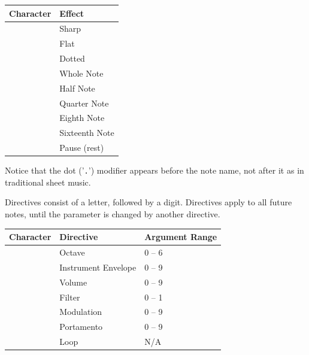 \begin{description}[leftmargin=2cm,style=nextline]
                  \begin{center}
                  {\setlength{\tabcolsep}{1mm}
                  \begin{tabular}{*{1}{|c}|l|}
                  \hline
                  {\bf Character}  & {\bf Effect} \\
                  \hline
                  \screentext{\#} & Sharp \\
                  \screentext{\$} & Flat \\
                    & Dotted \\
                    & Whole Note \\
                    & Half Note \\
                    & Quarter Note \\
                    & Eighth Note \\
                    & Sixteenth Note \\
                    & Pause (rest) \\
                  \hline
                  \end{tabular}
                  }
                  \end{center}

                  Notice that the dot ('{\tt .}') modifier appears before the note name, not after it as in traditional sheet music.

                  Directives consist of a letter, followed by a digit. Directives apply to all future notes, until the parameter is changed by another directive.

                  \begin{center}
                  {\setlength{\tabcolsep}{1mm}
                  \begin{tabular}{*{1}{|C{9mm}}|l|l|}
                  \hline
                  {\bf Character}  & {\bf Directive} & {\bf Argument Range} \\
                  \hline
                   & Octave              & 0 -- 6 \\
                   & Instrument Envelope & 0 -- 9 \\
                   & Volume              & 0 -- 9 \\
                   & Filter              & 0 -- 1 \\
                   & Modulation          & 0 -- 9 \\
                   & Portamento          & 0 -- 9 \\
                   & Loop                & N/A   \\
                  \hline
                  \end{tabular}
                  }
                  \end{center}


\end{description}

